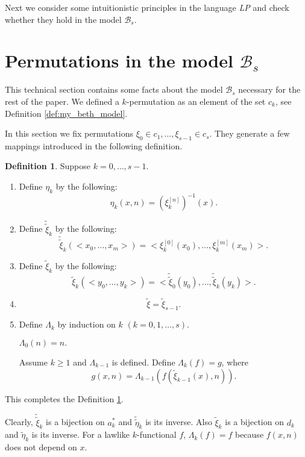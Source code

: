 \documentclass{asl}
\theoremstyle{definition}
\newtheorem{definition}{Definition}[section]
\begin{document}
Next we consider some intuitionistic principles in the language \textit{LP} and check whether they hold in the model $ \mathcal{B}_s$.

\section{Permutations in the model $\mathcal{B}_s$}
This technical section contains some facts about the model $\mathcal{B}_s$ necessary for the rest of the paper. 
We defined a $ k $-permutation as an element of the set $ c_{k} $, see Definition \ref{def:my_beth_model}.

In this section we fix permutations $ \xi_{0} \in c_{1},\ldots, \xi_{s-1} \in c_{s}$. They generate a few mappings introduced in the following definition.

\begin{definition}
Suppose $ k=0,\ldots,s-1 $.
\begin{enumerate}
\item Define $ \eta_{k} $ by the following:
\[ \eta_{k}(x,n)=\left(\xi^{[n]}_{k}\right)^{-1}(x). \]

\item Define $\tilde{\tilde{\xi}}_k$ by the following: 
\[\tilde{\tilde{\xi}}_k(< x_{0},\ldots, x_{m}>) = <\xi^{[0]}_{k}(x_{0}),\ldots, \xi^{[m]}_{k}(x_{m})> .\]

\item Define $\tilde{\xi}_k$ by the following:
\[\tilde{\xi}_k(< y_{0},\ldots,y_{k}>)=< \tilde{\tilde{\xi}}_{0}(y_{0}),\ldots, \tilde{\tilde{\xi}}_{k}(y_{k})>. \]

\item \[ \tilde{\xi}=\tilde{\xi}_{s-1}. \] 

\item Define $ \Lambda_{k} $ by induction on $k$ $ (k=0,1,\ldots,s)$.

$ \Lambda_{0}(n)=n. $

Assume $k\geqslant 1$ and $ \Lambda_{k-1}$ is defined. Define $\Lambda_{k}(f) = g$, where
\[ g(x,n)= \Lambda_{k-1}\left( f\left( \tilde{\xi}_{k-1}(x),n\right) \right).\]
\end{enumerate} \label{def:permutations}
\end{definition}

This completes the Definition \ref{def:permutations}. 

Clearly, $\tilde{\tilde{\xi}}_k$ is a bijection on $a_k^*$ and $\tilde{\tilde{\eta}}_k$ is its inverse. Also $\tilde{\xi}_k$ is a bijection on $d_k$ and $\tilde{\eta}_k$ is its inverse. For a lawlike $ k $-functional $f$, $ \Lambda_{k}(f)=f $ because $f(x,n)$ does not depend on $x$.
\end{document}
